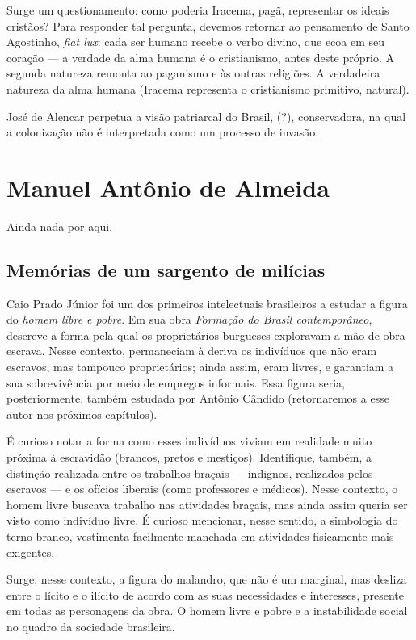 \documentclass[12pt]{book}
\begin{document}
				\par Surge um questionamento: como poderia Iracema, pagã, representar os ideais cristãos? Para responder tal pergunta, devemos retornar ao pensamento de Santo Agostinho, \textit{fiat lux}: cada ser humano recebe o verbo divino, que ecoa em seu coração — a verdade da alma humana é o cristianismo, antes deste próprio. A segunda natureza remonta ao paganismo e às outras religiões. A verdadeira natureza da alma humana (Iracema representa o cristianismo primitivo, natural).
				\par José de Alencar perpetua a visão patriarcal do Brasil, (?), conservadora, na qual a colonização não é interpretada como um processo de invasão.
			\section{Manuel Antônio de Almeida}
			\par Ainda nada por aqui.
				\subsection{Memórias de um sargento de milícias}
				\par Caio Prado Júnior foi um dos primeiros intelectuais brasileiros a estudar a figura do \textit{homem libre e pobre}. Em sua obra \textit{Formação do Brasil contemporâneo}, descreve a forma pela qual os proprietários burgueses exploravam a mão de obra escrava. Nesse contexto, permaneciam à deriva os indivíduos que não eram escravos, mas tampouco proprietários; ainda assim, eram livres, e garantiam a sua sobrevivência por meio de empregos informais. Essa figura seria, posteriormente, também estudada por Antônio Cândido (retornaremos a esse autor nos próximos capítulos).
				\par É curioso notar a forma como esses indivíduos viviam em realidade muito próxima à escravidão (brancos, pretos e mestiços). Identifique, também, a distinção realizada entre os trabalhos braçais — indignos, realizados pelos escravos — e os ofícios liberais (como professores e médicos). Nesse contexto, o homem livre buscava trabalho nas atividades braçais, mas ainda assim queria ser visto como indivíduo livre. É curioso mencionar, nesse sentido, a simbologia do terno branco, vestimenta facilmente manchada em atividades fisicamente mais exigentes.
				\par Surge, nesse contexto, a figura do malandro, que não é um marginal, mas desliza entre o lícito e o ilícito de acordo com as suas necessidades e interesses, presente em todas as personagens da obra. O homem livre e pobre e a instabilidade social no quadro da sociedade brasileira.
				
\end{document}
